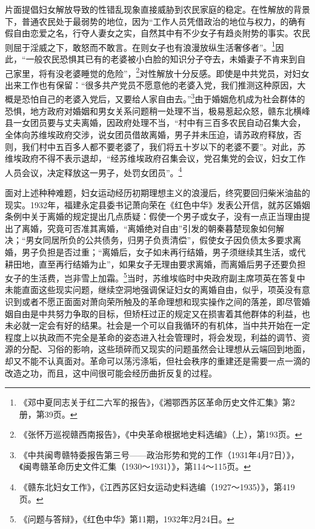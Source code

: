 片面提倡妇女解放导致的性错乱现象直接威胁到农民家庭的稳定。在性解放的背景下，普通农民处于最弱势的地位，因为“工作人员凭借政治的地位与权力，的确有假自由恋爱之名，行夺人妻女之实，自然其中有不少女子有趋炎附势的事实。农民则屈于淫威之下，敢怒而不敢言。在则女子也有浪漫放纵生活奢侈者”。\footnote{《邓中夏同志关于红二六军的报告》，《湘鄂西苏区革命历史文件汇集》第2册，第39页。}因此，“一般农民恐惧其已有的老婆被小白脸的知识分子夺去，未婚妻子不肯来到自己家里，将有没老婆睡觉的危险”，\footnote{《张怀万巡视赣西南报告》，《中央革命根据地史料选编》（上），第193页。}对性解放十分反感。即使是中共党员，对妇女出来工作也有保留：“很多共产党员不愿意他的老婆入党，我们推测这种原因，大概是恐怕自己的老婆入党后，又要给人家自由去。”\footnote{《中共闽粤赣特委报告第三号——政治形势和党的工作（1931年4月7日）》，《闽粤赣革命历史文件汇集（1930～1931）》，第114～115页。}由于婚姻危机成为社会群体的恐惧，地方政府对婚姻和男女关系问题稍一处理不当，极易惹起众怒，赣东北横峰县一女团员要与丈夫离婚，因政府处理不当，“村中有三百多农民自动召集大会，全体向苏维埃政府交涉，说女团员借故离婚，男子并未压迫，请苏政府释放，否则，我们村中五百多人都不要老婆了，我们将五十岁以下的老婆不要”。对此，苏维埃政府不得不表示退却，“经苏维埃政府召集会议，党召集党的会议，妇女工作人员会议，决定释放这一男子，处罚女团员”。\footnote{《赣东北妇女工作》，《江西苏区妇女运动史料选编（1927～1935）》，第419页。}


面对上述种种难题，妇女运动经历初期理想主义的浪漫后，终究要回归柴米油盐的现实。1932年，福建永定县委书记萧向荣在《红色中华》发表公开信，就苏区婚姻条例中关于离婚的规定提出几点质疑：假使一个男子或女子，没有一点正当理由提出了离婚，究竟可否准其离婚，“离婚绝对自由”引发的朝秦暮楚现象如何解决；“男女同居所负的公共债务，归男子负责清偿”，假使女子因负债太多要求离婚，男子负担是否过重；“离婚后，女子如未再行结婚，男子须继续其生活，或代耕田地，直至再行结婚为止”，如果女子无理由要求离婚，而离婚后男子还要负担女子的生活费，岂非雪上加霜。\footnote{《问题与答辩》，《红色中华》第11期，1932年2月24日。}当时，苏维埃临时中央政府副主席项英在答复中未能直面这些现实问题，继续空洞地强调保证妇女的离婚自由，似乎，项英没有意识到或者不愿正面面对萧向荣所触及的革命理想和现实操作之间的落差，即尽管婚姻自由是中共努力争取的目标，但矫枉过正的规定又在损害着其他群体的利益，也未必就一定会有好的结果。社会是一个可以自我循环的有机体，当中共开始在一定程度上以执政而不完全是革命的姿态进入社会管理时，将会发现，利益的调节、资源的分配、习俗的影响，这些琐碎而又现实的问题虽然会让理想从云端回到地面，却又不能不认真面对。革命可以荡污涤垢，但社会秩序的重建还是需要一点一滴的改造之功，而且，这中间很可能会经历曲折反复的过程。


